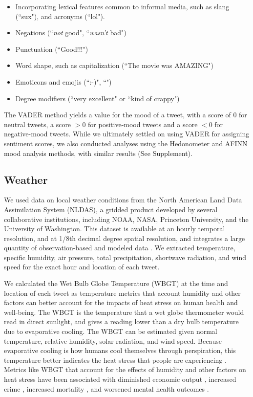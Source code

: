 \documentclass[fleqn,10pt]{wlscirep}
\begin{document}
\begin{itemize}
 \item Incorporating lexical features common to informal media, such as slang (``sux"), and acronyms (``lol").
 \item Negations (``\textit{not} good", ``\textit{wasn't} bad")
 \item Punctuation (``Good!!!")
 \item Word shape, such as capitalization (``The movie was AMAZING")
 \item Emoticons and emojis (``:-)", ``\emojismile")
 \item Degree modifiers (``very excellent" or ``kind of crappy")
\end{itemize} 

The VADER method yields a value for the mood of a tweet, with a score of 0 for neutral tweets, a score $> 0$ for positive-mood tweets and a score $< 0$ for negative-mood tweets. While we ultimately settled on using VADER for assigning sentiment scores, we also conducted analyses using the Hedonometer and AFINN mood analysis methods, with similar results (See Supplement).

\subsection*{Weather}
We used data on local weather conditions from the North American Land Data Assimilation System (NLDAS), a gridded product developed by several collaborative institutions, including NOAA, NASA, Princeton University, and the University of Washington. This dataset is available at an hourly temporal resolution, and at 1/8th decimal degree spatial resolution, and integrates a large quantity of observation-based and modeled data \cite{xia_continental-scale_2012}. We extracted temperature, specific humidity, air pressure, total precipitation, shortwave radiation, and wind speed for the exact hour and location of each tweet. 

We calculated the Wet Bulb Globe Temperature (WBGT) at the time and location of each tweet as temperature metrics that account humidity and other factors can better account for the impacts of heat stress on human health and well-being. The WBGT is the temperature that a wet globe thermometer would read in direct sunlight, and gives a reading lower than a dry bulb temperature due to evaporative cooling. The WBGT can be estimated given normal temperature, relative humidity, solar radiation, and wind speed. Because evaporative cooling is how humans cool themselves through perspiration, this temperature better indicates the heat stress that people are experiencing \cite{budd2008wet}. Metrics like WBGT that account for the effects of humidity and other factors on heat stress have been associated with diminished economic output \cite{rao2020projections}, increased crime \cite{hu2017impact}, increased mortality \cite{chien2016spatiotemporal, armstrong2019role}, and worsened mental health outcomes \cite{vida2012relationship, ding2016importance}.
\end{document}
